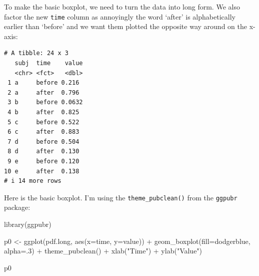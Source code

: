 \documentclass[
  letterpaper,
  DIV=11,
  numbers=noendperiod]{scrreprt}
\newenvironment{Shaded}{\begin{snugshade}}{\end{snugshade}}
\newcommand{\AttributeTok}[1]{\textcolor[rgb]{0.40,0.45,0.13}{#1}}
\newcommand{\DecValTok}[1]{\textcolor[rgb]{0.68,0.00,0.00}{#1}}
\newcommand{\FunctionTok}[1]{\textcolor[rgb]{0.28,0.35,0.67}{#1}}
\newcommand{\NormalTok}[1]{\textcolor[rgb]{0.00,0.23,0.31}{#1}}
\newcommand{\OtherTok}[1]{\textcolor[rgb]{0.00,0.23,0.31}{#1}}
\newcommand{\SpecialCharTok}[1]{\textcolor[rgb]{0.37,0.37,0.37}{#1}}
\newcommand{\StringTok}[1]{\textcolor[rgb]{0.13,0.47,0.30}{#1}}
\begin{document}
To make the basic boxplot, we need to turn the data into long form. We
also factor the new \texttt{time} column as annoyingly the word `after'
is alphabetically earlier than `before' and we want them plotted the
opposite way around on the x-axis:

\begin{Shaded}
\end{Shaded}

\begin{verbatim}
# A tibble: 24 x 3
   subj  time    value
   <chr> <fct>   <dbl>
 1 a     before 0.216 
 2 a     after  0.796 
 3 b     before 0.0632
 4 b     after  0.825 
 5 c     before 0.522 
 6 c     after  0.883 
 7 d     before 0.504 
 8 d     after  0.130 
 9 e     before 0.120 
10 e     after  0.138 
# i 14 more rows
\end{verbatim}

Here is the basic boxplot. I'm using the \texttt{theme\_pubclean()} from
the \texttt{ggpubr} package:

\begin{Shaded}
\begin{Highlighting}[]
\FunctionTok{library}\NormalTok{(ggpubr)}

\NormalTok{p0 }\OtherTok{\textless{}{-}} \FunctionTok{ggplot}\NormalTok{(pdf.long, }\FunctionTok{aes}\NormalTok{(}\AttributeTok{x=}\NormalTok{time, }\AttributeTok{y=}\NormalTok{value)) }\SpecialCharTok{+}
  \FunctionTok{geom\_boxplot}\NormalTok{(}\AttributeTok{fill=}\StringTok{\textquotesingle{}dodgerblue\textquotesingle{}}\NormalTok{, }\AttributeTok{alpha=}\NormalTok{.}\DecValTok{3}\NormalTok{) }\SpecialCharTok{+}
  \FunctionTok{theme\_pubclean}\NormalTok{() }\SpecialCharTok{+}
  \FunctionTok{xlab}\NormalTok{(}\StringTok{"Time"}\NormalTok{) }\SpecialCharTok{+}
  \FunctionTok{ylab}\NormalTok{(}\StringTok{"Value"}\NormalTok{)}

\NormalTok{p0}
\end{Highlighting}
\end{Shaded}
\end{document}
